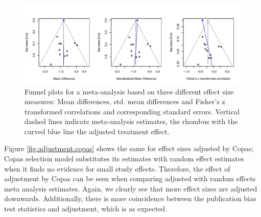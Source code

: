\documentclass[11pt,a4paper,twoside]{book}\usepackage[]{graphicx}\usepackage[]{color}
\newenvironment{knitrout}{}{} %
\begin{document}
\begin{figure}
\begin{knitrout}
\color{fgcolor}

{\centering \includegraphics[width=\textwidth-3cm]{figure/ch03_figunnamed-chunk-21-1} 

}



\end{knitrout}
\caption{Funnel plots for a meta-analysis based on three different effect size measures: Mean differences, std. mean differences and Fisher's z transformed correlations and corresponding standard errors. Vertical dashed lines indicate meta-analysis estimates, the rhombus with the curved blue line the adjusted treatment effect.}
\label{fig:funnel.plot.change}
\end{figure}


Figure \ref{fig:adjustment.copas} shows the same for effect sizes adjusted by Copas; Copas selection model substitutes its estimates with random effect estimates when it finds no evidence for small study effects. Therefore, the effect of adjustment by Copas can be seen when comparing adjusted with random effects meta analysis estimates. Again, we clearly see that more effect sizes are adjusted downwards. Additionally, there is more coincidence between the publication bias test statistics and adjustment, which is as expected. \\
\end{document}

